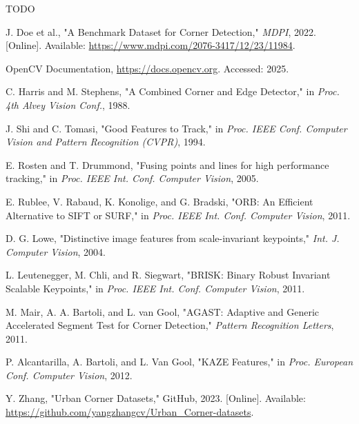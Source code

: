 \documentclass[journal]{IEEEtran}
\begin{document}
TODO





\begin{thebibliography}{1}

    J. Doe et al., "A Benchmark Dataset for Corner Detection," \textit{MDPI}, 2022. [Online]. Available: \url{https://www.mdpi.com/2076-3417/12/23/11984}.

    OpenCV Documentation, \url{https://docs.opencv.org}. Accessed: 2025.

    C. Harris and M. Stephens, "A Combined Corner and Edge Detector," in \textit{Proc. 4th Alvey Vision Conf.}, 1988.

    J. Shi and C. Tomasi, "Good Features to Track," in \textit{Proc. IEEE Conf. Computer Vision and Pattern Recognition (CVPR)}, 1994.

    E. Rosten and T. Drummond, "Fusing points and lines for high performance tracking," in \textit{Proc. IEEE Int. Conf. Computer Vision}, 2005.

    E. Rublee, V. Rabaud, K. Konolige, and G. Bradski, "ORB: An Efficient Alternative to SIFT or SURF," in \textit{Proc. IEEE Int. Conf. Computer Vision}, 2011.

    D. G. Lowe, "Distinctive image features from scale-invariant keypoints," \textit{Int. J. Computer Vision}, 2004.

    L. Leutenegger, M. Chli, and R. Siegwart, "BRISK: Binary Robust Invariant Scalable Keypoints," in \textit{Proc. IEEE Int. Conf. Computer Vision}, 2011.

    M. Mair, A. A. Bartoli, and L. van Gool, "AGAST: Adaptive and Generic Accelerated Segment Test for Corner Detection," \textit{Pattern Recognition Letters}, 2011.

    P. Alcantarilla, A. Bartoli, and L. Van Gool, "KAZE Features," in \textit{Proc. European Conf. Computer Vision}, 2012.

    Y. Zhang, "Urban Corner Datasets," GitHub, 2023. [Online]. Available: \url{https://github.com/yangzhangcv/Urban_Corner-datasets}.

\end{thebibliography}
\end{document}
